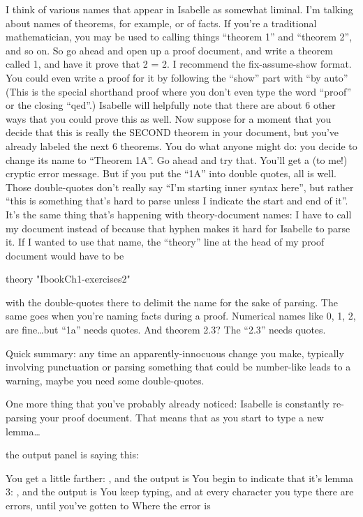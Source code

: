 I think of various names that appear in Isabelle as somewhat liminal. I'm talking about names of theorems, for example, or of facts. If you're a traditional mathematician, you may be used to calling things ``theorem 1'' and ``theorem 2'', and so on. So go ahead and open up a proof document, and write a theorem called 1, and have it prove that 2 = 2. I recommend the fix-assume-show format. You could even write a proof for it by following the ``show'' part with ``by auto''  (This is the special shorthand proof where you don't even type the word ``proof'' or the closing ``qed''.) Isabelle will helpfully note that there are about 6 other ways that you could prove this as well. Now suppose for a moment that you decide that this is really the SECOND theorem in your document, but you've already labeled the next 6 theorems. You do what anyone might do: you decide to change its name to ``Theorem 1A''. Go ahead and try that. You'll get a (to me!) cryptic error message. But if you put the ``1A'' into double quotes, all is well. Those double-quotes don't really say ``I'm starting inner syntax here'', but rather ``this is something that's hard to parse unless I indicate the start and end of it''. It's the same thing that's happening with theory-document names: I have to call my document   instead of   because that hyphen makes it hard for Isabelle to parse it. If I wanted to use that name, the ``theory'' line at the head of my proof document would have to be 

theory "IbookCh1-exercises2"

with the double-quotes there to delimit the name for the sake of parsing. The same goes when you're naming facts during a proof. Numerical names like 0, 1, 2, are fine\ldots but ``1a'' needs quotes. And theorem 2.3? The ``2.3'' needs quotes. 

Quick summary: any time an apparently-innocuous change you make, typically involving punctuation or parsing something that could be number-like leads to a warning, maybe you need some double-quotes.

One more thing that you've probably already noticed: Isabelle is constantly re-parsing your proof document. That means that as you start to type a new lemma\ldots

the output panel is saying this:

You get a little farther: , and the output is 
You begin to indicate that it's lemma 3: , and the output is 
You keep typing, and at every character you type there are errors, until you've gotten to 
Where the error is 

